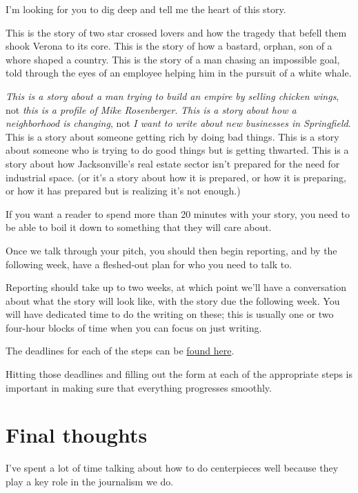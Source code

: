\documentclass[
  12pt,
  american,
  letterpaperpaper,
  extrafontsizes,onecolumn,openright
  ]{memoir}
\begin{document}
I'm looking for you to dig deep and tell me the heart of this story.

This is the story of two star crossed lovers and how the tragedy that befell them shook Verona to its core. This is the story of how a bastard, orphan, son of a whore shaped a country. This is the story of a man chasing an impossible goal, told through the eyes of an employee helping him in the pursuit of a white whale.

\emph{This is a story about a man trying to build an empire by selling chicken wings}, not \emph{this is a profile of Mike Rosenberger}. \emph{This is a story about how a neighborhood is changing}, not \emph{I want to write about new businesses in Springfield}. This is a story about someone getting rich by doing bad things. This is a story about someone who is trying to do good things but is getting thwarted. This is a story about how Jacksonville's real estate sector isn't prepared for the need for industrial space. (or it's a story about how it is prepared, or how it is preparing, or how it has prepared but is realizing it's not enough.)

If you want a reader to spend more than 20 minutes with your story, you need to be able to boil it down to something that they will care about.

Once we talk through your pitch, you should then begin reporting, and by the following week, have a fleshed-out plan for who you need to talk to.

Reporting should take up to two weeks, at which point we'll have a conversation about what the story will look like, with the story due the following week. You will have dedicated time to do the writing on these; this is usually one or two four-hour blocks of time when you can focus on just writing.

The deadlines for each of the steps can be \href{https://bizj.us/1qk3ql}{found here}.

Hitting those deadlines and filling out the form at each of the appropriate steps is important in making sure that everything progresses smoothly.

\hypertarget{final-thoughts-2}{%
\section*{Final thoughts}\label{final-thoughts-2}}

I've spent a lot of time talking about how to do centerpieces well because they play a key role in the journalism we do.
\end{document}

